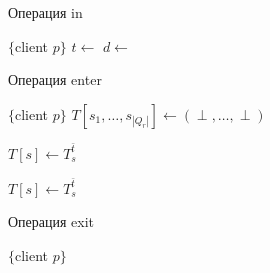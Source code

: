 \begin{algorithm}[H]
	\caption{Операция in}\label{alg5}
	\begin{algorithmic}[1]
		\Statex $\{$client $p \}$
		\Repeat
		\State $t \gets$ 
		\State {}
		\State \Return{$\perp$}
		\EndIf
		\State $d \gets$ 
		\State {}
		\EndFunction
	\end{algorithmic}
\end{algorithm}
\begin{algorithm}[H]
	\caption{Операция enter}\label{alg9}
	\begin{algorithmic}[1]
		\Statex $\{$client $p \}$
		\State $T[s_1, \dots, s_{|Q_r|}] \gets (\perp, \dots, \perp)$
		
		\State {}
		\State $T[s] \gets T_s^{\bar t}$
		\EndFor
		
		\State {}
		\State $T[s] \gets T_s^{\bar t}$
		\EndFor
		
		\State {}
		\EndIf
		\State \Return{$\perp$}
		\EndFunction
	\end{algorithmic}
\end{algorithm}
\begin{algorithm}[H]
	\caption{Операция exit}\label{alg10}
	\begin{algorithmic}[1]
		\Statex $\{$client $p \}$
		\State {}
		\EndFor
		\EndProcedure
	\end{algorithmic}
\end{algorithm}


